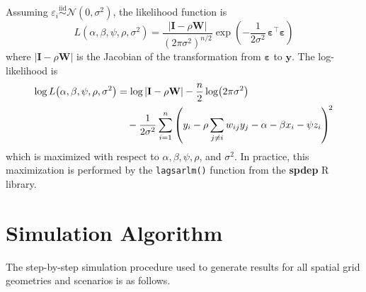\documentclass{article}[11pt]
\begin{document}
Assuming $\varepsilon_i \overset{\text{iid}}{\sim} \mathcal{N}(0,\sigma^2)$, the likelihood function is
\begin{equation}
    L\!\left(\alpha,\beta,\psi,\rho,\sigma^2\right)
    = \frac{|\mathbf{I} - \rho\mathbf{W}|}{\left(2\pi\sigma^2\right)^{n/2}}
      \exp\!\left(-\frac{1}{2\sigma^2}\,\boldsymbol{\varepsilon}^{\top}\boldsymbol{\varepsilon}\right)
\end{equation}
where $|\mathbf{I}-\rho\mathbf{W}|$ is the Jacobian of the transformation from $\boldsymbol{\varepsilon}$ to $\mathbf{y}$. The log-likelihood is
\begin{align}
    \log L\!\left(\alpha,\beta,\psi,\rho,\sigma^2\right)
    &= \log|\mathbf{I} - \rho\mathbf{W}|
       - \frac{n}{2}\log\!\left(2\pi\sigma^2\right) \notag \\
    &\quad - \frac{1}{2\sigma^2}
        \sum_{i=1}^{n}
        \left(y_i - \rho\sum_{j \neq i}w_{ij}y_j - \alpha - \beta x_i - \psi z_i\right)^{\!2}
\end{align}
which is maximized with respect to $\alpha, \beta, \psi, \rho$, and $\sigma^2$. In practice, this maximization is performed by the \texttt{lagsarlm()} function from the \textbf{spdep} R library\cite{bivand_r_2022}.

\section{Simulation Algorithm}\label{appendix:SimAlgorithm}

The step-by-step simulation procedure used to generate results for all spatial grid geometries and scenarios is as follows.
\end{document}
